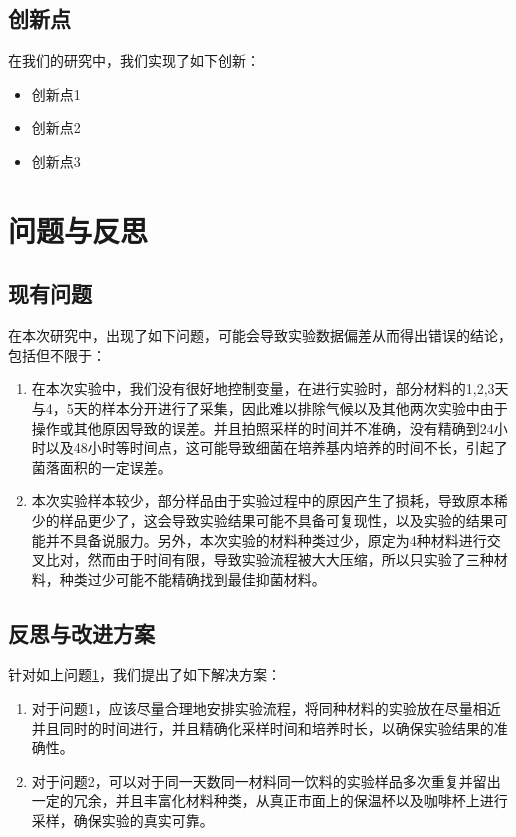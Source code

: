 \documentclass[12pt,a4paper]{ctexart}
\begin{document}
\subsection{创新点}
在我们的研究中，我们实现了如下创新：
\begin{itemize}
    \item 创新点1
    \item 创新点2
    \item 创新点3
\end{itemize}

\section{问题与反思}\label{sec:problem}
\subsection{现有问题}
在本次研究中，出现了如下问题，可能会导致实验数据偏差从而得出错误的结论，包括但不限于：
\begin{enumerate}
    \item 在本次实验中，我们没有很好地控制变量，在进行实验时，部分材料的1,2,3天与4，5天的样本分开进行了采集，因此难以排除气候以及其他两次实验中由于操作或其他原因导致的误差。并且拍照采样的时间并不准确，没有精确到24小时以及48小时等时间点，这可能导致细菌在培养基内培养的时间不长，引起了菌落面积的一定误差。
    \item 本次实验样本较少，部分样品由于实验过程中的原因产生了损耗，导致原本稀少的样品更少了，这会导致实验结果可能不具备可复现性，以及实验的结果可能并不具备说服力。另外，本次实验的材料种类过少，原定为4种材料进行交叉比对，然而由于时间有限，导致实验流程被大大压缩，所以只实验了三种材料，种类过少可能不能精确找到最佳抑菌材料。
\end{enumerate}

\subsection{反思与改进方案}
针对如上问题\ref{sec:problem}，我们提出了如下解决方案：
\begin{enumerate}
    \item 对于问题1，应该尽量合理地安排实验流程，将同种材料的实验放在尽量相近并且同时的时间进行，并且精确化采样时间和培养时长，以确保实验结果的准确性。
    \item 对于问题2，可以对于同一天数同一材料同一饮料的实验样品多次重复并留出一定的冗余，并且丰富化材料种类，从真正市面上的保温杯以及咖啡杯上进行采样，确保实验的真实可靠。
\end{enumerate}
\end{document}
